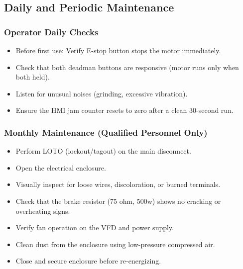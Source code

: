 \documentclass[hidelinks,12pt]{article}
\begin{document}
\subsection{Daily and Periodic Maintenance}

\subsubsection{Operator Daily Checks}
\begin{itemize}
    \item Before first use: Verify E-stop button stops the motor immediately.
    \item Check that both deadman buttons are responsive (motor runs only when both held).
    \item Listen for unusual noises (grinding, excessive vibration).
    \item Ensure the HMI jam counter resets to zero after a clean 30-second run.
\end{itemize}

\subsubsection{Monthly Maintenance (Qualified Personnel Only)}
\begin{itemize}
    \item Perform LOTO (lockout/tagout) on the main disconnect.
    \item Open the electrical enclosure.
    \item Visually inspect for loose wires, discoloration, or burned terminals.
    \item Check that the brake resistor (75 ohm, 500w) shows no cracking or overheating signs.
    \item Verify fan operation on the VFD and power supply.
    \item Clean dust from the enclosure using low-pressure compressed air.
    \item Close and secure enclosure before re-energizing.
\end{itemize}
\end{document}
